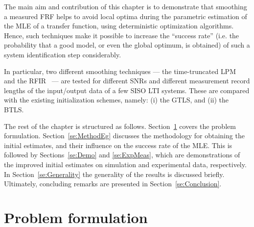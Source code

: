 The main aim and contribution of this chapter is to demonstrate that smoothing a measured \gls{FRF} helps to avoid local optima during the parametric estimation of the \gls{MLE} of a transfer function, using deterministic optimization algorithms.
Hence, such techniques make it possible to increase the ``success rate'' (i.e. the probability that a good model, or even the global optimum, is obtained) of such a system identification step considerably.

In particular, two different smoothing techniques --- the time-truncated \gls{LPM}~\citep{Lumori2014TIM} and the \gls{RFIR}~\citep{Pillonetto2010,Chen2012} --- are tested for different \glspl{SNR} and different measurement record lengths of the input/output data of a few \gls{SISO} \gls{LTI} systems.
These are compared with the existing initialization schemes, namely: (i) the \gls{GTLS}, and (ii) the \gls{BTLS}.

The rest of the chapter is structured as follows. Section~\ref{se:ProbForm} covers the problem formulation. Section~\ref{se:MethodEg} discusses the methodology for obtaining the initial estimates, and their influence on the success rate of the \gls{MLE}. 
This is followed by Sections~\ref{se:Demo} and \ref{se:ExpMeas}, which are demonstrations of the improved initial estimates on simulation and experimental data, respectively.
In Section~\ref{se:Generality} the generality of the results is discussed briefly.
Ultimately, concluding remarks are presented in Section~\ref{se:Conclusion}.


\section{Problem formulation}\label{se:ProbForm}


